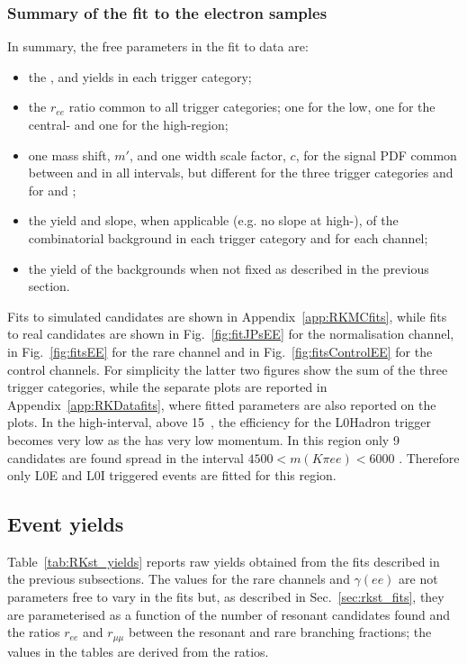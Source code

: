 
\subsubsection{Summary of the fit to the electron samples}

In summary, the free parameters in the fit to data are:
%
\begin{itemize}
\item the \BdToKstJPsee, \BdToKstPsiee and \BdToKstGee yields in each trigger category;
\item the $r_{ee}$ ratio common to all trigger categories; one for the low, one for the central- and one for the high-\qsq region;
\item one mass shift, $m'$, and one width scale factor, $c$, for the signal PDF common between \BdToKstJPsee and \BdToKstee in all intervals,
but different for the three trigger categories and for \BdToKstPsiee and \BdToKstGee;
\item the yield and slope, when applicable (e.g. no slope at high-\qsq), of the combinatorial background in each trigger category and for each channel;
\item the yield of the backgrounds when not fixed as described in the previous section.
\end{itemize}

Fits to simulated \BdToKstJPsee candidates are shown in Appendix~\ref{app:RKMCfits}, while
fits to real candidates are shown in Fig.~\ref{fig:fitJPsEE} for the normalisation channel, in Fig.~\ref{fig:fitsEE} 
for the rare channel and in Fig.~\ref{fig:fitsControlEE} for the control channels.
For simplicity the latter two figures show the sum of the three trigger categories, while the separate plots are
reported in Appendix~\ref{app:RKDatafits}, where fitted parameters are also reported on the plots.
%
In the high-\qsq interval, above 15~\gevgevcccc, the efficiency for the
L0Hadron trigger becomes very low as the \Kstarz has very low momentum.
In this region only 9 candidates are found spread in the interval
$4500 < m(K\pi ee) < 6000$ \mevcc. Therefore
only L0E and L0I triggered events are fitted for this region.

\subsection{Event yields}

Table~\ref{tab:RKst_yields} reports raw yields obtained from the
fits described in the previous subsections. The values for the rare channels and $\gamma(ee)$ are
 not parameters free to vary in the fits but, as described in Sec.~\ref{sec:rkst_fits}, they are parameterised
as a function of the number of resonant candidates found and the ratios $r_{ee}$ and $r_{\mu\mu}$
between the resonant and rare branching fractions; the values in the tables are derived from the ratios. 

